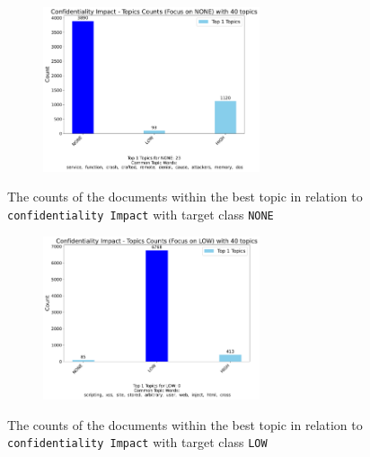 \documentclass[12pt]{article}
\begin{document}
\begin{figure}
	\ContinuedFloat*
	\centering
	\begin{subfigure}{\textwidth}
		\centering
		\includegraphics[width=0.7\textwidth]{figures/confidentialityImpact/merged_top_k_topics_category_focus_counts_confidentialityImpact_NONE_k1.pdf}
	\end{subfigure}

	\caption{The counts of the documents within the best topic in relation to \texttt{confidentiality Impact} with target class \texttt{NONE}}
	\label{fig:confidentialityImpact_60_NONE}
\end{figure}

\begin{figure}
	\ContinuedFloat
	\centering
	\begin{subfigure}{\textwidth}
		\centering
		\includegraphics[width=0.7\textwidth]{figures/confidentialityImpact/merged_top_k_topics_category_focus_counts_confidentialityImpact_LOW_k1.pdf}
	\end{subfigure}

	\caption{The counts of the documents within the best topic in relation to \texttt{confidentiality Impact} with target class \texttt{LOW}}
	\label{fig:confidentialityImpact_60_LOW}
\end{figure}
\end{document}
